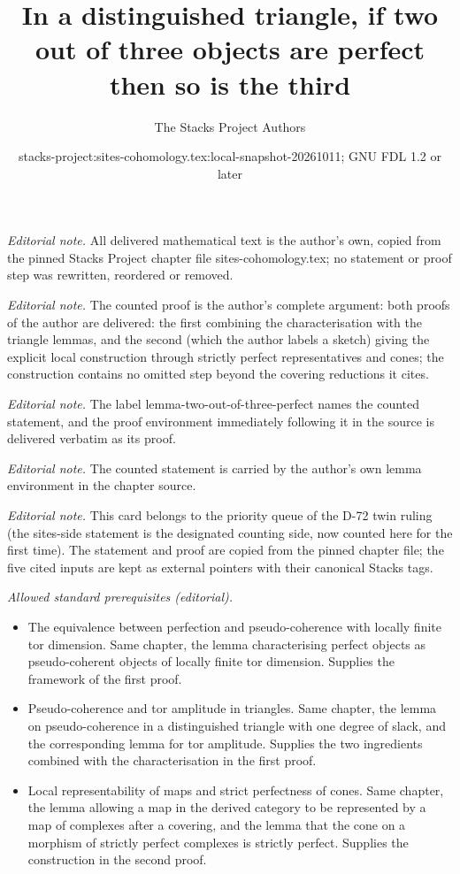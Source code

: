 \documentclass[10pt,a4paper]{amsart}
\title{In a distinguished triangle, if two out of three objects are perfect then so is the third}
\author{The Stacks Project Authors}
\date{stacks-project:sites-cohomology.tex:local-snapshot-20261011; GNU FDL 1.2 or later}
\theoremstyle{plain}
\theoremstyle{definition}
\theoremstyle{remark}
\numberwithin{equation}{subsection}
\begin{document}
\maketitle
\noindent\textit{Editorial note.} All delivered mathematical text is the author's own, copied from the pinned Stacks Project chapter file sites-cohomology.tex; no statement or proof step was rewritten, reordered or removed.\par\medskip
\noindent\textit{Editorial note.} The counted proof is the author's complete argument: both proofs of the author are delivered: the first combining the characterisation with the triangle lemmas, and the second (which the author labels a sketch) giving the explicit local construction through strictly perfect representatives and cones; the construction contains no omitted step beyond the covering reductions it cites.\par\medskip
\noindent\textit{Editorial note.} The label lemma-two-out-of-three-perfect names the counted statement, and the proof environment immediately following it in the source is delivered verbatim as its proof.\par\medskip
\noindent\textit{Editorial note.} The counted statement is carried by the author's own lemma environment in the chapter source.\par\medskip
\noindent\textit{Editorial note.} This card belongs to the priority queue of the D-72 twin ruling (the sites-side statement is the designated counting side, now counted here for the first time). The statement and proof are copied from the pinned chapter file; the five cited inputs are kept as external pointers with their canonical Stacks tags.\par\medskip
\noindent\textit{Allowed standard prerequisites (editorial).}\begin{itemize}
\item The equivalence between perfection and pseudo-coherence with locally finite tor dimension. Same chapter, the lemma characterising perfect objects as pseudo-coherent objects of locally finite tor dimension. Supplies the framework of the first proof.
\item Pseudo-coherence and tor amplitude in triangles. Same chapter, the lemma on pseudo-coherence in a distinguished triangle with one degree of slack, and the corresponding lemma for tor amplitude. Supplies the two ingredients combined with the characterisation in the first proof.
\item Local representability of maps and strict perfectness of cones. Same chapter, the lemma allowing a map in the derived category to be represented by a map of complexes after a covering, and the lemma that the cone on a morphism of strictly perfect complexes is strictly perfect. Supplies the construction in the second proof.
\end{itemize}\medskip
\end{document}
